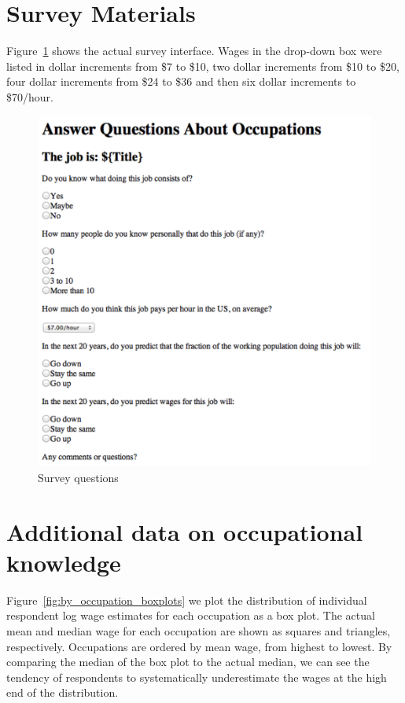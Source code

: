 \documentclass[12pt]{article}
\begin{document}
\appendix 

\section{Survey Materials} \label{sec:survey}  
Figure~\ref{fig:survey} shows the actual survey interface.  
Wages in the drop-down box were listed in dollar increments from \$7 to \$10, two dollar increments from \$10 to \$20, four dollar increments from \$24 to \$36 and then six dollar increments to \$70/hour.  

\begin{figure}
\caption{Survey questions \label{fig:survey}}
\begin{minipage}{0.75 \linewidth}
\includegraphics[width = \linewidth]{./images/survey.png}
\end{minipage}  
\end{figure} 

\section{Additional data on occupational knowledge} \label{sec:additional}

Figure~\ref{fig:by_occupation_boxplots} we plot the distribution of individual respondent log wage estimates for each occupation as a box plot. 
The actual mean and median wage for each occupation are shown as squares and triangles, respectively. 
Occupations are ordered by mean wage, from highest to lowest. 
By comparing the median of the box plot to the actual median, we can see the tendency of respondents to systematically underestimate the wages at the high end of the distribution. 
\end{document}
